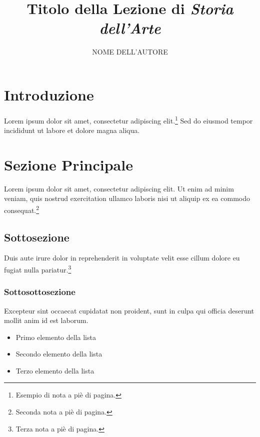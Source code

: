 \documentclass[12pt, a4paper, twoside]{article}
\title{Titolo della Lezione di \textit{Storia dell'Arte}}
\author{NOME DELL'AUTORE}
\begin{document}
\maketitle

\newpage

\section{Introduzione}
Lorem ipsum dolor sit amet, consectetur adipiscing elit.\footnote{Esempio di nota a piè di pagina.} Sed do eiusmod tempor incididunt ut labore et dolore magna aliqua.

\section{Sezione Principale}
Lorem ipsum dolor sit amet, consectetur adipiscing elit. \cite{opera1} Ut enim ad minim veniam, quis nostrud exercitation ullamco laboris nisi ut aliquip ex ea commodo consequat.\footnote{Seconda nota a piè di pagina.}

\subsection{Sottosezione}
Duis aute irure dolor in reprehenderit in voluptate velit esse cillum dolore eu fugiat nulla pariatur.\footnote{Terza nota a piè di pagina.} 
\subsubsection{Sottosottosezione}
Excepteur sint occaecat cupidatat non proident, sunt in culpa qui officia deserunt mollit anim id est laborum.

\begin{itemize}
    \item Primo elemento della lista %
    \item Secondo elemento della lista
    \item Terzo elemento della lista
\end{itemize}
\end{document}
